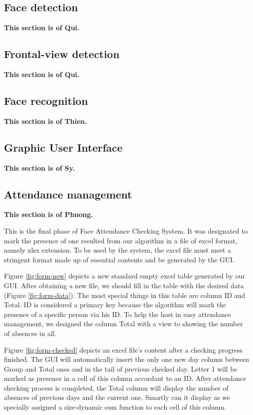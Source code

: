 \documentclass[journal, twocolumn]{IEEEtran}
\begin{document}
\subsection{Face detection}
\label{face-detection}
\textbf{This section is of Qui.}

\subsection{Frontal-view detection}
\label{frontal-view-detection}
\textbf{This section is of Qui.}

\subsection{Face recognition}
\label{face-recognition}
\textbf{This section is of Thien.}

\subsection{Graphic User Interface}
\label{gui}
\textbf{This section is of Sy.}


\subsection{Attendance management}
\label{attendance-management}
\textbf{This section is of Phuong.}

This is the final phase of Face Attendance Checking System.
It was designated to mark the presence of one resulted from
our algorithm in a file of excel format, namely xlsx extension.
To be used by the system, the excel file must meet
a stringent format made up of essential contents and be
generated by the GUI. 

Figure \ref{fig:form-new} depicts a new standard empty
excel table generated by our GUI. After obtaining a new file, we should fill in the table with the desired data (Figure \ref{fig:form-data}). The most special things in this table are column ID and Total. 
ID is considered a primary key because the algorithm will mark the presence of a specific person via his ID. 
To help the host in easy attendance management, we designed the column Total with a view to showing the number of absences in all.

Figure \ref{fig:form-checked} depicts an excel file's content after a checking progress finished. 
The GUI will automatically insert the only one new day column between Group and Total ones and in the tail of previous checked day. 
Letter 1 will be marked as presence in a cell of this column accordant to an ID. 
After attendance checking process is completed, the Total column will display the number of absences of previous days and the current one. Smartly can it display as we specially assigned a size-dynamic sum function to each cell of this column.
\end{document}
